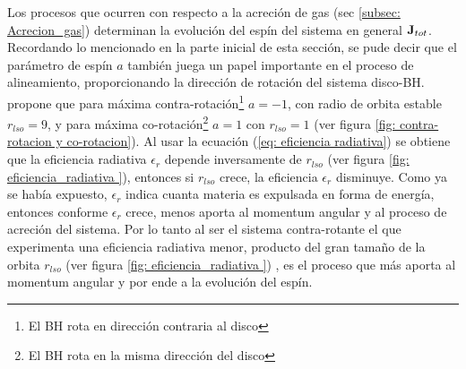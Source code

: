 Los procesos que ocurren con respecto a la acreción de gas (sec \ref{subsec: Acrecion_gas}) determinan la evolución del espín del sistema en general ${\bf{J}}_{tot}$. Recordando lo mencionado en la parte inicial de esta sección, se pude decir que el parámetro de espín $a$ también juega un papel importante en el proceso de alineamiento, proporcionando la dirección de rotación del sistema disco-BH. \cite{king2005} propone que para máxima contra-rotación\footnote{El BH rota en dirección contraria al disco} $a=-1$, con radio de orbita estable $r_{lso}=9$, y para máxima co-rotación\footnote{El BH rota en la misma dirección del disco} $a=1$ con $r_{lso}=1$ (ver figura \ref{fig: contra-rotacion y co-rotacion}). %
Al usar la ecuación (\ref{eq: eficiencia radiativa}) se obtiene que la eficiencia radiativa $\epsilon_{r}$ depende inversamente de $r_{lso}$ (ver figura \ref{fig: eficiencia_radiativa }), entonces si $r_{lso}$ crece, la eficiencia $\epsilon_{r}$ disminuye. Como ya se había expuesto, $\epsilon_{r}$ indica cuanta materia es expulsada en forma de energía, entonces conforme $\epsilon_{r}$ crece, menos aporta al momentum angular y al proceso de acreción del sistema. Por lo tanto al ser el sistema contra-rotante el que experimenta una eficiencia radiativa menor, producto del  gran tamaño de la orbita $r_{lso}$ (ver figura \ref{fig: eficiencia_radiativa }) 
, es el proceso que más aporta al momentum angular y por ende a la evolución del espín. 

